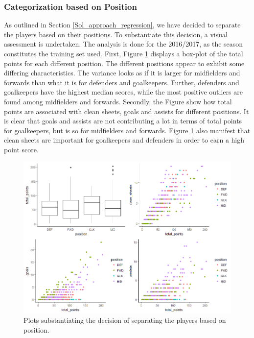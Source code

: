 \subsubsection{Categorization based on Position}

As outlined in Section \ref{Sol_approach_regression}, we have decided to separate the players based on their positions. To substantiate this decision, a visual assessment is undertaken. The analysis is done for the 2016/2017, as the season constitutes the training set used. First, Figure \ref{fig:cluster_plots} displays a box-plot of the total points for each different position. The different positions appear to exhibit some differing characteristics. The variance looks as if it is larger for midfielders and forwards than what it is for defenders and goalkeepers. Further, defenders and goalkeepers have the highest median scores, while the most positive outliers are found among midfielders and forwards. Secondly, the Figure show how total points are associated with clean sheets, goals and assists for different positions. It is clear that goals and assists are not contributing a lot in terms of total points for goalkeepers, but is so for midfielders and forwards. Figure \ref{fig:cluster_plots} also manifest that clean sheets are important for goalkeepers and defenders in order to earn a high point score.

\begin{figure}[H]
    \centering
    \includegraphics[scale=0.55]{fig/chapter_6/cluster_plots.png}
    \caption{Plots substantiating the decision of separating the players based on position.}
\label{fig:cluster_plots}    
\end{figure}


